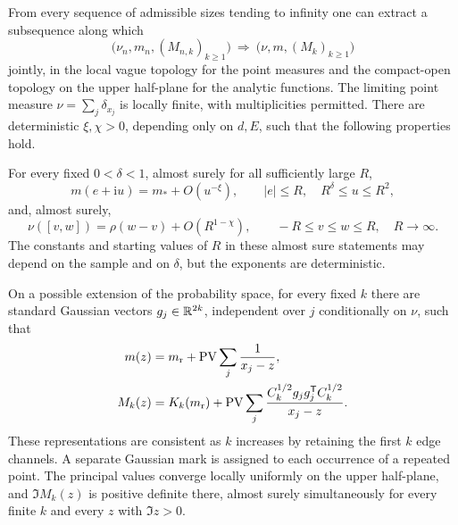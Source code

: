 \begin{proposition}\label{prop:microscopic-limit}
From every sequence of admissible sizes tending to infinity one can
extract a subsequence along which
\[
 \bigl(\nu_n,m_n,(M_{n,k})_{k\ge1}\bigr)
 \ \Longrightarrow\
 \bigl(\nu,m,(M_k)_{k\ge1}\bigr)
\]
jointly, in the local vague topology for the point measures and the
compact-open topology on the upper half-plane for the analytic
functions. The limiting point measure \(\nu=\sum_j\delta_{x_j}\) is
locally finite, with multiplicities permitted. There are deterministic
\(\xi,\chi>0\), depending only on \(d,E\), such that the following
properties hold.

For every fixed \(0<\delta<1\), almost surely for all sufficiently
large \(R\),
\begin{equation}\label{eq:mesoscopic-limit}
 m(e+\mathrm i u)=m_*+O(u^{-\xi}),
 \qquad |e|\le R,\quad R^\delta\le u\le R^2,
\end{equation}
and, almost surely,
\begin{equation}\label{eq:discrepancy}
 \nu([v,w])=\rho(w-v)+O(R^{1-\chi}),
 \qquad -R\le v\le w\le R,\quad R\longrightarrow\infty.
\end{equation}
The constants and starting values of \(R\) in these almost sure
statements may depend on the sample and on \(\delta\), but the exponents
are deterministic.

On a possible extension of the probability space, for every fixed
\(k\) there are standard Gaussian vectors \(g_j\in\mathbb R^{2k}\), independent
over \(j\) conditionally on \(\nu\), such that
\begin{equation}\label{eq:marked-representation}
 \begin{split}
  m(z)&=m_{\rm r}+\operatorname{PV}\sum_j\frac1{x_j-z},\\
  M_k(z)&=K_k(m_{\rm r})
       +\operatorname{PV}\sum_j
       \frac{C_k^{1/2}g_jg_j^{\mathsf T}C_k^{1/2}}{x_j-z}.
 \end{split}
\end{equation}
These representations are consistent as \(k\) increases by retaining
the first \(k\) edge channels. A separate Gaussian mark is assigned to
each occurrence of a repeated point. The principal values converge
locally uniformly on the upper half-plane, and
\(\Im M_k(z)\) is positive definite there, almost surely simultaneously
for every finite \(k\) and every \(z\) with \(\Im z>0\).
\end{proposition}

